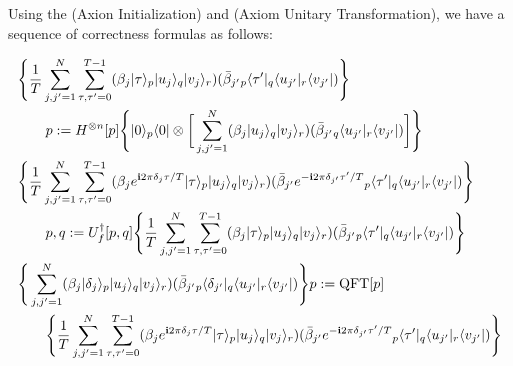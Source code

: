 Using the (Axion Initialization) and (Axiom Unitary Transformation), we have a sequence of correctness formulas as follows:

\begin{align}
&\Bigg\{\frac{1}{T}\sum_{j,j^\prime = 1}^N\sum_{\tau,\tau^\prime = 0}^{T-1}(\beta_j|\tau\rangle_p|u_j\rangle_q|v_j\rangle_r)
(\bar{\beta}_{j^\prime}{}_p\langle\tau^\prime|_q\langle u_{j^\prime}|_r\langle v_{j^\prime}|) \Bigg\} \notag\\
&\quad\quad p := H^{\otimes n}[p]
\Bigg\{|0\rangle_p\langle0|\otimes\bigg[\sum_{j,j^\prime = 1}^N(\beta_j|u_j\rangle_q|v_j\rangle_r)
(\bar{\beta}_{j^\prime}{}_q\langle u_{j^\prime}|_r\langle v_{j^\prime}|)\bigg] \Bigg\}\label{HHL1}
\\
&\Bigg\{\frac{1}{T}\sum_{j,j^\prime = 1}^N\sum_{\tau,\tau^\prime = 0}^{T-1}(\beta_je^{\mathbf{i} 2\pi \delta_j\tau/T}|\tau\rangle_p|u_j\rangle_q|v_j\rangle_r)
(\bar{\beta}_{j^\prime}e^{-\mathbf{i} 2\pi \delta_{j^\prime}\tau^\prime/T}{}_p\langle\tau^\prime|_q\langle u_{j^\prime}|_r\langle v_{j^\prime}|) \Bigg\} \notag\\
&\quad\quad p,q := U_f^{\dag}[p,q]
\Bigg\{\frac{1}{T}\sum_{j,j^\prime = 1}^N\sum_{\tau,\tau^\prime = 0}^{T-1}(\beta_j|\tau\rangle_p|u_j\rangle_q|v_j\rangle_r)
(\bar{\beta}_{j^\prime}{}_p\langle\tau^\prime|_q\langle u_{j^\prime}|_r\langle v_{j^\prime}|) \Bigg\}\label{HHL2}
\\
&\Bigg\{ \sum_{j,j^\prime = 1}^N (\beta_j|\delta_j\rangle_p|u_j\rangle_q|v_j\rangle_r)(\bar{\beta}_{j^\prime}{}_p\langle\delta_{j^\prime}|_q\langle u_{j^\prime}|_r\langle v_{j^\prime}|)   \Bigg\} p := {\rm QFT}[p] \notag\\
&\quad\quad \Bigg\{\frac{1}{T}\sum_{j,j^\prime = 1}^N\sum_{\tau,\tau^\prime = 0}^{T-1}(\beta_je^{\mathbf{i} 2\pi \delta_j\tau/T}|\tau\rangle_p|u_j\rangle_q|v_j\rangle_r)
(\bar{\beta}_{j^\prime}e^{-\mathbf{i} 2\pi \delta_{j^\prime}\tau^\prime/T}{}_p\langle\tau^\prime|_q\langle u_{j^\prime}|_r\langle v_{j^\prime}|) \Bigg\}\label{HHL3}
\end{align}
